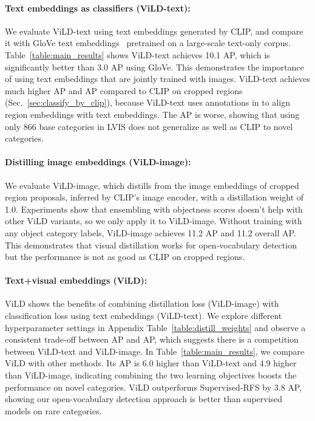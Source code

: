 \documentclass{article} \usepackage{iclr2022_conference,times}
\begin{document}
\paragraph{Text embeddings as classifiers (ViLD-text):}
We evaluate ViLD-text 
using text embeddings generated by CLIP,
and compare it with GloVe text embeddings~\citep{pennington2014glove} pretrained on a large-scale text-only corpus.
Table~\ref{table:main_results} shows
ViLD-text achieves 10.1 AP, which is significantly better than 3.0 AP using GloVe. This demonstrates the importance of using text embeddings that are jointly trained with images. 
ViLD-text achieves much higher AP and AP compared to CLIP on cropped regions (Sec.~\ref{sec:classify_by_clip}), because ViLD-text uses annotations in  to align region embeddings with text embeddings. The AP is worse, showing that using only 866 base categories in LVIS does not generalize as well as CLIP to novel categories.


\paragraph{Distilling image embeddings (ViLD-image):}
We evaluate ViLD-image, which distills from the image embeddings of cropped region proposals, inferred by CLIP's image encoder, 
with a distillation weight of 1.0. Experiments show that ensembling with objectness scores doesn't help with other ViLD variants, so we only apply it to ViLD-image.
Without training with any object category labels, ViLD-image achieves 11.2 AP and 11.2 overall AP.
This demonstrates that visual distillation works for open-vocabulary detection but the performance is not as good as CLIP on cropped regions.


\paragraph{Text+visual embeddings (ViLD):}
ViLD shows the benefits of combining distillation loss (ViLD-image) with classification loss using text embeddings (ViLD-text).
We explore different hyperparameter settings in Appendix Table~\ref{table:distill_weights} and observe a consistent trade-off between AP and AP, which suggests there is a competition between ViLD-text and ViLD-image.
In Table~\ref{table:main_results}, we compare ViLD with other methods.
Its AP is 6.0 higher than ViLD-text and 4.9 higher than ViLD-image, indicating combining the two learning objectives boosts the performance on novel categories.
ViLD outperforms Supervised-RFS by 3.8 AP, showing our open-vocabulary detection approach is better than supervised models on rare categories. 
\end{document}
